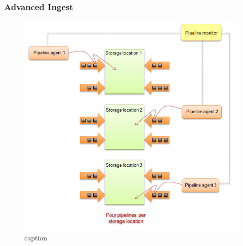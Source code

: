\begin{frame}
    \frametitle{Advanced Ingest}
\begin{figure}[h]
    \centering
        \includegraphics[width=.7\textwidth]{images/acceleratedIngest.jpg}
    \caption{caption}
    \label{fig:images_acceleratedIngest}
\end{figure}
\end{frame}